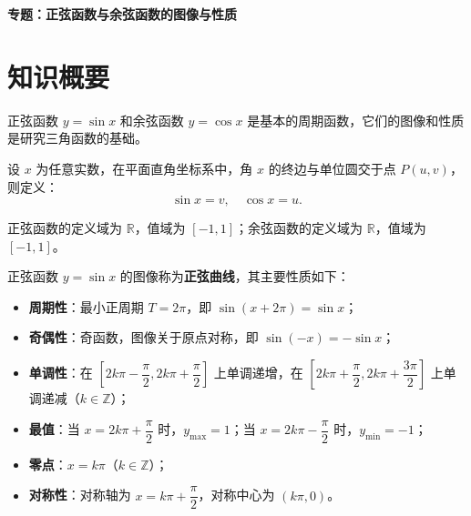 \documentclass[11pt]{ctexrep}
\begin{document}
\begin{center}
    {\LARGE\bfseries 专题：正弦函数与余弦函数的图像与性质}
\end{center}

\section*{知识概要}

正弦函数 $y = \sin x$ 和余弦函数 $y = \cos x$ 是基本的周期函数，它们的图像和性质是研究三角函数的基础。

\begin{definition}[正弦函数与余弦函数的定义]
    设 $x$ 为任意实数，在平面直角坐标系中，角 $x$ 的终边与单位圆交于点 $P(u, v)$，则定义：
    \[
        \sin x = v, \quad \cos x = u.
    \]
    
    正弦函数的定义域为 $\mathbb{R}$，值域为 $[-1, 1]$；余弦函数的定义域为 $\mathbb{R}$，值域为 $[-1, 1]$。
\end{definition}

\begin{property}[正弦函数的图像与性质]
    正弦函数 $y = \sin x$ 的图像称为\textbf{正弦曲线}，其主要性质如下：
    \begin{itemize}
        \item \textbf{周期性}：最小正周期 $T = 2\pi$，即 $\sin(x + 2\pi) = \sin x$；
        \item \textbf{奇偶性}：奇函数，图像关于原点对称，即 $\sin(-x) = -\sin x$；
        \item \textbf{单调性}：在 $\left[2k\pi - \dfrac{\pi}{2}, 2k\pi + \dfrac{\pi}{2}\right]$ 上单调递增，在 $\left[2k\pi + \dfrac{\pi}{2}, 2k\pi + \dfrac{3\pi}{2}\right]$ 上单调递减（$k \in \mathbb{Z}$）；
        \item \textbf{最值}：当 $x = 2k\pi + \dfrac{\pi}{2}$ 时，$y_{\max} = 1$；当 $x = 2k\pi - \dfrac{\pi}{2}$ 时，$y_{\min} = -1$；
        \item \textbf{零点}：$x = k\pi$（$k \in \mathbb{Z}$）；
        \item \textbf{对称性}：对称轴为 $x = k\pi + \dfrac{\pi}{2}$，对称中心为 $(k\pi, 0)$。
    \end{itemize}
\end{property}
\end{document}
